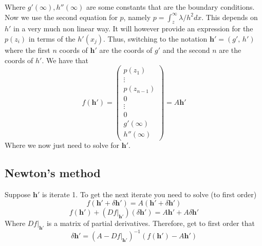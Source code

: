 \documentclass{article}
\newcommand{\bs}{\boldsymbol}                               %
\begin{document}
Where $g'(\infty), h''(\infty)$ are some constants that are the boundary 
conditions. 
\\

Now we use the second equation for $p$, namely $p=\int_z^{\infty} 
\lambda/h^2 dx$. This depends on $h'$ in a very much non linear way.
It will however provide an expression for the $p(z_i)$ in terms of
the $h'(x_j)$. Thus, switching to the notation  
$\bs{h}'=(g',\,h')$ where the first $n$ coords of $\bs{h}'$ are the
coords of $g'$ and the second $n$ are the coords of $h'$. We have that
\[ f(\bs{h}') = \left( \begin{array}{c} p(z_1) \\ \vdots \\ p(z_{n-1}) 
\\[4pt] 0 \\ \vdots \\ 0 \\ g'(\infty) \\ h''(\infty) \end{array} \right) =
 A  \bs{h}' \]
Where we now just need to solve for $\bs{h}'$.

\subsection*{Newton's method}
Suppose $\bs{h}'$ is iterate 1. To get the next iterate you need to solve (to 
first order)
\[ f(\bs{h}'+\delta\bs{h}') = A(\bs{h}'+\delta \bs{h}')\]
\[ f(\bs{h}') + (Df|_{\bs{h}'})(\delta\bs{h}') = A\bs{h}'+A\delta \bs{h}'\]
Where $Df|_{\bs{h}'}$ is a matrix of partial derivatives. Therefore, get to 
first order that 
\[ \delta \bs{h}' =  (A-Df|_{\bs{h}'})^{-1}(f(\bs{h}') - A\bs{h}') \]
\end{document}
